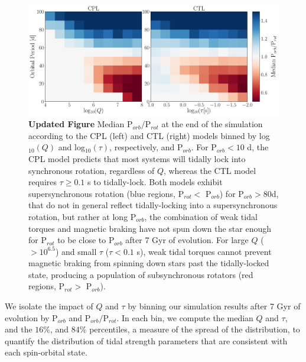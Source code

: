\documentclass[twocolumn]{aastex61}
\newcommand{\xxx}[1]{{\textbf{#1}}}
\begin{document}
\begin{figure}[ht]
	\includegraphics[width=\textwidth]{../Plots/qTauPorbRatioHist.pdf}
   \caption{\xxx{Updated Figure} Median P$_{orb}/$P$_{rot}$ at the end of the simulation according to the CPL (left) and CTL (right) models binned by log$_{10}(Q)$ and log$_{10}(\tau)$, respectively, and P$_{orb}$.  For P$_{orb} < 10$ d, the CPL model predicts that most systems will tidally lock into synchronous rotation, regardless of $Q$, whereas the CTL model requires $\tau \geq 0.1$ s to tidally-lock.  Both models exhibit supersynchronous rotation (blue regions, P$_{rot} <$ P$_{orb}$) for P$_{orb} > 80$d, that do not in general reflect tidally-locking into a supersynchronous rotation, but rather at long P$_{orb}$, the combination of weak tidal torques and magnetic braking have not spun down the star enough for P$_{rot}$ to be close to P$_{orb}$ after 7 Gyr of evolution. For large $Q$ ($> 10^{6.5}$) and small $\tau$ ($\tau < 0.1$ s), weak tidal torques cannot prevent magnetic braking from spinning down stars past the tidally-locked state, producing a population of subsynchronous rotators (red regions, P$_{rot} >$ P$_{orb}$).}%
    \label{fig:qTauLock}%
\end{figure}


We isolate the impact of $Q$ and $\tau$ by binning our simulation results after 7 Gyr of evolution by P$_{orb}$ and P$_{orb}/$P$_{rot}$.  In each bin, we compute the median $Q$ and $\tau$, and the $16\%$, and $84\%$ percentiles, a measure of the spread of the distribution, to quantify the distribution of tidal strength parameters that are consistent with each spin-orbital state.  
\end{document}
